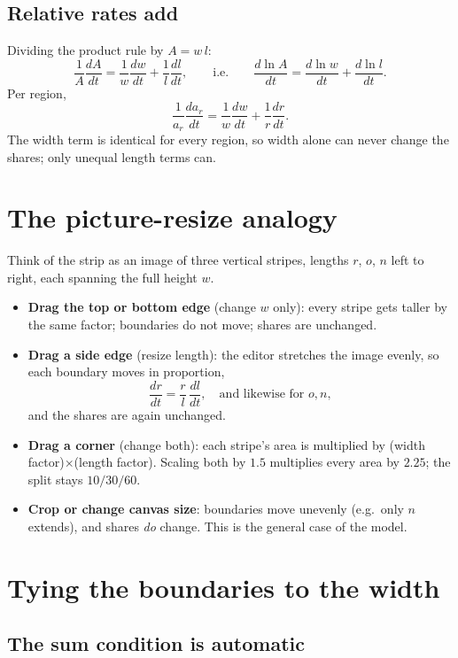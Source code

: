 \documentclass[11pt]{article}
\begin{document}
\subsection{Relative rates add}

Dividing the product rule by $A = w\,l$:
\[
  \frac{1}{A}\frac{dA}{dt} = \frac{1}{w}\frac{dw}{dt} + \frac{1}{l}\frac{dl}{dt},
  \qquad\text{i.e.}\qquad
  \frac{d\ln A}{dt} = \frac{d\ln w}{dt} + \frac{d\ln l}{dt}.
\]
Per region,
\[
  \frac{1}{a_r}\frac{da_r}{dt} = \frac{1}{w}\frac{dw}{dt} + \frac{1}{r}\frac{dr}{dt}.
\]
The width term is identical for every region, so width alone can never change the shares; only unequal length terms can.

\section{The picture-resize analogy}

Think of the strip as an image of three vertical stripes, lengths $r$, $o$, $n$ left to right, each spanning the full height $w$.

\begin{itemize}
  \item \textbf{Drag the top or bottom edge} (change $w$ only): every stripe gets taller by the same factor; boundaries do not move; shares are unchanged.
  \item \textbf{Drag a side edge} (resize length): the editor stretches the image evenly, so each boundary moves in proportion,
  \[
    \frac{dr}{dt} = \frac{r}{l}\,\frac{dl}{dt}, \quad\text{and likewise for } o, n,
  \]
  and the shares are again unchanged.
  \item \textbf{Drag a corner} (change both): each stripe's area is multiplied by (width factor)$\times$(length factor). Scaling both by $1.5$ multiplies every area by $2.25$; the split stays $10/30/60$.
  \item \textbf{Crop or change canvas size}: boundaries move unevenly (e.g.\ only $n$ extends), and shares \emph{do} change. This is the general case of the model.
\end{itemize}

\section{Tying the boundaries to the width}

\subsection{The sum condition is automatic}
\end{document}
